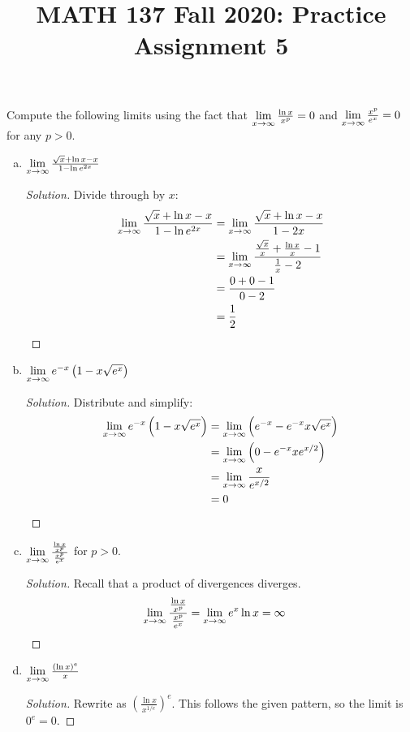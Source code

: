 \documentclass{agony}
\title{MATH 137 Fall 2020: Practice Assignment 5}
\begin{document}
\thispagestyle{firstpage}

\textbf{\thetitle}

\question Compute the following limits using the fact that $\lim\limits_{x\to\infty}\frac{\ln x}{x^p}=0$
and $\lim\limits_{x\to\infty}\frac{x^p}{e^x}=0$ for any $p>0$.
\begin{enumerate}[(a)]
  \item $\lim\limits_{x\to\infty} \frac{\sqrt{x} + \ln x - x}{1 - \ln e^{2x}}$
        \begin{proof}[Solution]
          Divide through by $x$: \begin{align*}
            \lim_{x\to\infty} \frac{\sqrt{x} + \ln x - x}{1 - \ln e^{2x}}
             & = \lim_{x\to\infty} \frac{\sqrt{x} + \ln x - x}{1 - 2x}                              \\
             & = \lim_{x\to\infty} \frac{\frac{\sqrt{x}}{x} + \frac{\ln x}{x} - 1}{\frac{1}{x} - 2} \\
             & = \frac{0 + 0 - 1}{0 - 2}                                                   \\
             & = \frac{1}{2} \qedhere
          \end{align*}
        \end{proof}

  \item $\lim\limits_{x\to\infty} e^{-x}\left(1-x\sqrt{e^x}\right)$
        \begin{proof}[Solution]
          Distribute and simplify: \begin{align*}
            \lim_{x\to\infty} e^{-x}\left(1-x\sqrt{e^x}\right)
             & = \lim_{x\to\infty} \left(e^{-x}-e^{-x}x\sqrt{e^x}\right) \\
             & = \lim_{x\to\infty} \left(0- e^{-x} x e^{x/2} \right)     \\
             & = \lim_{x\to\infty} \frac{x}{e^{x/2}}                     \\
             & = 0 \qedhere
          \end{align*}
        \end{proof}

  \item $\lim\limits_{x\to\infty} \frac{\frac{\ln x}{x^p}}{\frac{x^p}{e^x}}$ for $p > 0$.
        \begin{proof}[Solution]
          Recall that a product of divergences diverges.
          \begin{align*}
            \lim_{x\to\infty} \frac{\frac{\ln x}{x^p}}{\frac{x^p}{e^x}}
             & = \lim_{x\to\infty} e^x\ln x = \infty \qedhere
          \end{align*}
        \end{proof}

  \item $\lim\limits_{x\to\infty} \frac{(\ln x)^e}{x}$
        \begin{proof}[Solution]
          Rewrite as $\left(\frac{\ln x}{x^{1/e}}\right)^e$.
          This follows the given pattern, so the limit is $0^e=0$.
        \end{proof}
\end{enumerate}
\end{document}
